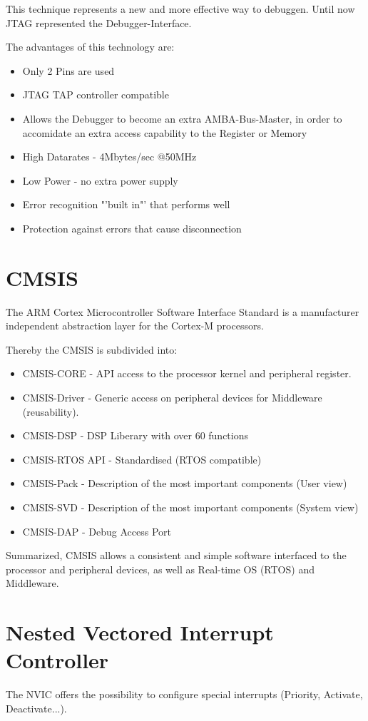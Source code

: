 This technique represents a new and more effective way to debuggen. Until now JTAG
represented the Debugger-Interface.

The advantages of this technology are:

\begin{itemize}
\item Only 2 Pins are used
\item JTAG TAP controller compatible
\item Allows the Debugger to become an extra AMBA-Bus-Master, in order to accomidate an extra
access capability to the Register or Memory
\item High Datarates - 4Mbytes/sec @50MHz
\item Low Power - no extra power supply
\item Error recognition "'built in"' that performs well
\item Protection against errors that cause disconnection
\end{itemize}

\section{CMSIS}
The ARM Cortex Microcontroller Software Interface Standard is a manufacturer independent
abstraction layer for the Cortex-M processors.

Thereby the CMSIS is subdivided into:
\begin{itemize}
\item CMSIS-CORE - API access to the processor kernel and peripheral register.
\item CMSIS-Driver - Generic access on peripheral devices for Middleware
			(reusability).
\item CMSIS-DSP - DSP Liberary with over 60 functions
\item CMSIS-RTOS API - Standardised (RTOS compatible)
\item CMSIS-Pack - Description of the most important components (User view)
\item CMSIS-SVD - Description of the most important components (System view)
\item CMSIS-DAP - Debug Access Port
\end{itemize}

Summarized, CMSIS allows a consistent and simple software interfaced to the processor
and peripheral devices, as well as Real-time OS (RTOS) and Middleware.

\section{Nested Vectored Interrupt Controller}
The NVIC offers the possibility to configure special interrupts
(Priority, Activate, Deactivate...).

